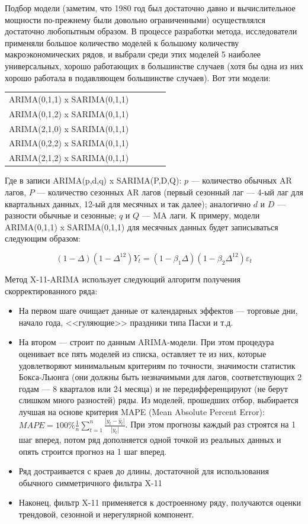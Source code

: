 \documentclass[final,pdftex]{../../template/epsilonj}\usepackage[]{graphicx}\usepackage[]{color}
\begin{document}
Подбор модели (заметим, что 1980 год был достаточно давно и вычислительное мощности по-прежнему были довольно ограниченными) осуществлялся достаточно любопытным образом. В процессе разработки метода, исследователи применяли большое количество моделей к большому количеству макроэкономических рядов, и выбрали среди этих моделей 5 наиболее универсальных, хорошо работающих в большинстве случаев (хотя бы одна из них хорошо работала в подавляющем большинстве случаев). Вот эти модели:

\begin{center}
\begin{tabular}{ccccc}
ARIMA(0,1,1) x SARIMA(0,1,1) \\
ARIMA(0,1,2) x SARIMA(0,1,1) \\
ARIMA(2,1,0) x SARIMA(0,1,1) \\
ARIMA(0,2,2) x SARIMA(0,1,1) \\
ARIMA(2,1,2) x SARIMA(0,1,1) \\
\end{tabular}
\end{center}

Где в записи ARIMA(p,d,q) x SARIMA(P,D,Q): $p$ --- количество обычных AR лагов, $P$ --- количество сезонных AR лагов (первый сезонный лаг --- 4-ый лаг для квартальных данных, 12-ый для месячных и так далее); аналогично $d$ и $D$ --- разности обычные и сезонные; $q$ и $Q$ --- MA лаги. К примеру, модели ARIMA(0,1,1) x SARIMA(0,1,1) для месячных данных будет записываться следующим образом:

\[
(1 - \Delta)(1 - \Delta^{12})Y_t = (1 - \beta_1 \Delta)(1 - \beta_2 \Delta^{12}) \varepsilon_t
\]

Метод X-11-ARIMA использует следующий алгоритм получения скорректированного ряда: 

\begin{itemize}
\item На первом шаге очищает данные от календарных эффектов --- торговые дни, начало года, <<гуляющие>> праздники типа Пасхи и т.д.
\item На втором --- строит по данным ARIMA-модели. При этом процедура оценивает все пять моделей из списка, оставляет те из них, которые удовлетворяют минимальным критериям по точности, значимости статистик Бокса-Льюнга (они должны быть незначимыми для лагов, соответствующих 2 годам --- 8 кварталов или 24 месяца) и не передифференцируют (не берут слишком много разностей) ряды. Из моделей, прошедших отбор, выбирается лучшая на основе критерия MAPE (Mean Absolute Percent Error): $MAPE = 100\% \frac{1}{n} \sum_{t = 1}^n \frac{|y_t - \hat{y}_t|}{|y_t|}$. При этом прогнозы каждый раз строятся на 1 шаг вперед, потом ряд дополняется одной точкой из реальных данных и опять строится прогноз на 1 шаг вперед. 
\item Ряд достраивается с краев до длины, достаточной для использования обычного симметричного фильтра X-11
\item Наконец, фильтр X-11 применяется к достроенному ряду, получаются оценки трендовой, сезонной и нерегулярной компонент. 
\end{itemize}
\end{document}

